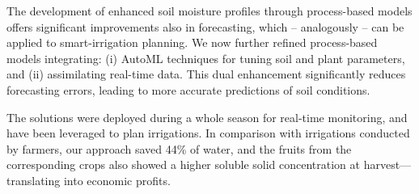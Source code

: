 The development of enhanced soil moisture profiles through process-based models offers significant improvements also in forecasting, which -- analogously -- can be applied to smart-irrigation planning.
We now further refined process-based models integrating: (i) AutoML techniques for tuning soil and plant parameters, and (ii) assimilating real-time data. This dual enhancement significantly reduces forecasting errors, leading to more accurate predictions of soil conditions.

The solutions were deployed during a whole season for real-time monitoring, and have been leveraged to plan irrigations.
In comparison with irrigations conducted by farmers, our approach saved 44\% of water, and the fruits from the corresponding crops also showed a higher soluble solid concentration at harvest---translating into economic profits.



